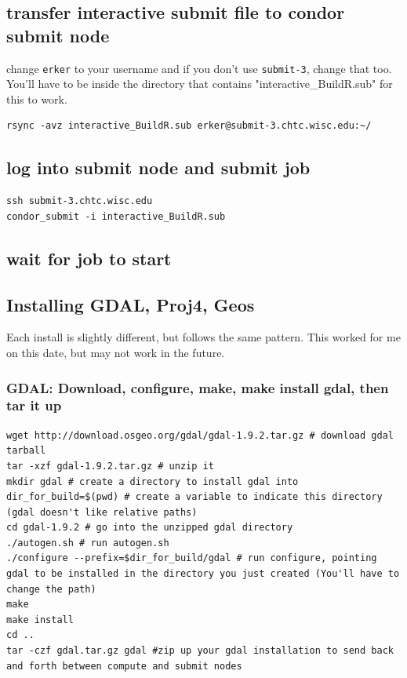 \documentclass{article}
\begin{document}
\subsection*{transfer interactive submit file to condor submit node}
\label{sec:org42d5dd6}
change \texttt{erker} to your username and if you don't use \texttt{submit-3}, change
that too.  You'll have to be inside the directory that contains
"interactive\_BuildR.sub" for this to work.
\begin{verbatim}
rsync -avz interactive_BuildR.sub erker@submit-3.chtc.wisc.edu:~/
\end{verbatim}

\subsection*{log into submit node and submit job}
\label{sec:org7f6167f}
\begin{verbatim}
ssh submit-3.chtc.wisc.edu
condor_submit -i interactive_BuildR.sub
\end{verbatim}

\subsection*{wait for job to start}
\label{sec:org7e86685}

\subsection*{Installing GDAL, Proj4, Geos}
\label{sec:org220940b}
Each install is slightly different, but follows the same pattern.
This worked for me on this date, but may not work in the future.
\subsubsection*{GDAL: Download, configure, make, make install gdal, then tar it up}
\label{sec:orgb529026}
\begin{verbatim}
wget http://download.osgeo.org/gdal/gdal-1.9.2.tar.gz # download gdal tarball
tar -xzf gdal-1.9.2.tar.gz # unzip it
mkdir gdal # create a directory to install gdal into
dir_for_build=$(pwd) # create a variable to indicate this directory (gdal doesn't like relative paths)
cd gdal-1.9.2 # go into the unzipped gdal directory
./autogen.sh # run autogen.sh
./configure --prefix=$dir_for_build/gdal # run configure, pointing gdal to be installed in the directory you just created (You'll have to change the path)
make
make install
cd ..
tar -czf gdal.tar.gz gdal #zip up your gdal installation to send back and forth between compute and submit nodes
\end{verbatim}
\end{document}
